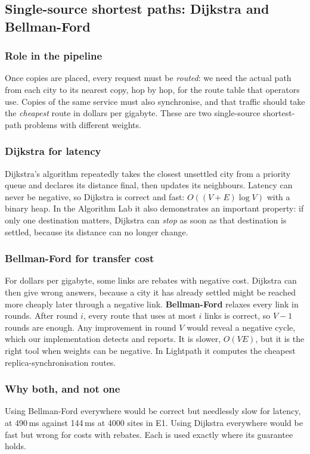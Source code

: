 \subsection{Single-source shortest paths: Dijkstra and Bellman-Ford}
\subsubsection{Role in the pipeline}
Once copies are placed, every request must be \emph{routed}: we need the actual path from each city to its nearest copy, hop by hop, for the route table that operators use. Copies of the same service must also synchronise, and that traffic should take the \emph{cheapest} route in dollars per gigabyte. These are two single-source shortest-path problems with different weights.

\subsubsection{Dijkstra for latency}
Dijkstra's algorithm \cite{dijkstra1959} repeatedly takes the closest unsettled city from a priority queue and declares its distance final, then updates its neighbours. Latency can never be negative, so Dijkstra is correct and fast: $O((V+E)\log V)$ with a binary heap. In the Algorithm Lab it also demonstrates an important property: if only one destination matters, Dijkstra can \emph{stop} as soon as that destination is settled, because its distance can no longer change.

\subsubsection{Bellman-Ford for transfer cost}
For dollars per gigabyte, some links are rebates with negative cost. Dijkstra can then give wrong answers, because a city it has already settled might be reached more cheaply later through a negative link. \textbf{Bellman-Ford} \cite{bellman1958} relaxes every link in rounds. After round $i$, every route that uses at most $i$ links is correct, so $V-1$ rounds are enough. Any improvement in round $V$ would reveal a negative cycle, which our implementation detects and reports. It is slower, $O(VE)$, but it is the right tool when weights can be negative. In Lightpath it computes the cheapest replica-synchronisation routes.

\subsubsection{Why both, and not one}
Using Bellman-Ford everywhere would be correct but needlessly slow for latency, at 490\,ms against 144\,ms at 4000 sites in E1. Using Dijkstra everywhere would be fast but wrong for costs with rebates. Each is used exactly where its guarantee holds.

